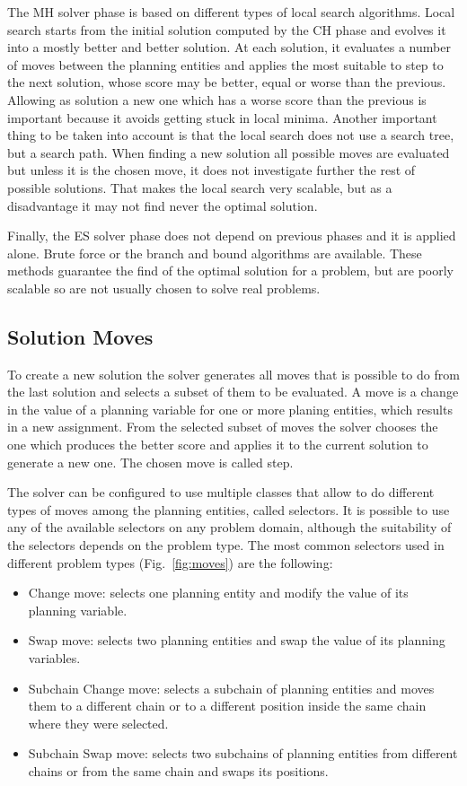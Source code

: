 \documentclass[runningheads,a4paper]{llncs}
\begin{document}
The MH solver phase is based on different types of local search algorithms. Local search starts from the initial solution computed by the CH phase and evolves it into a mostly better and better solution. At each solution, it evaluates a number of moves between the planning entities and applies the most suitable to step to the next solution, whose score may be better, equal or worse than the previous. Allowing as solution a new one which has a worse score than the previous is important because it avoids getting stuck in local minima. Another important thing to be taken into account is that the local search does not use a search tree, but a search path. When finding a new solution all possible moves are evaluated but unless it is the chosen move, it does not investigate further the rest of possible solutions. That makes the local search very scalable, but as a disadvantage it may not find never the optimal solution.

Finally, the ES solver phase does not depend on previous phases and it is applied alone. Brute force or the branch and bound algorithms are available. These methods guarantee the find of the optimal solution for a problem, but are poorly scalable so are not usually chosen to solve real problems.

\subsection{Solution Moves}
    \label{sec:sol_moves}
    
To create a new solution the solver generates all moves that is possible to do from the last solution and selects a subset of them to be evaluated. A move is a change in the value of a planning variable for one or more planing entities, which results in a new assignment. From the selected subset of moves the solver chooses the one which produces the better score and applies it to the current solution to generate a new one. The chosen move is called step.

The solver can be configured to use multiple classes that allow to do different types of moves among the planning entities, called selectors. It is possible to use any of the available selectors on any problem domain, although the suitability of the selectors depends on the problem type. The most common selectors used in different problem types (Fig.~\ref{fig:moves}) are the following:

    \begin{itemize}
    		\item Change move: selects one planning entity and modify the value of its planning variable.
    		\item Swap move: selects two planning entities and swap the value of its planning variables.
    		\item Subchain Change move: selects a subchain of planning entities and moves them to a different chain or to a different position inside the same chain where they were selected.
    		\item Subchain Swap move: selects two subchains of planning entities from different chains or from the same chain and swaps its positions.
	\end{itemize}
	
\end{document}

